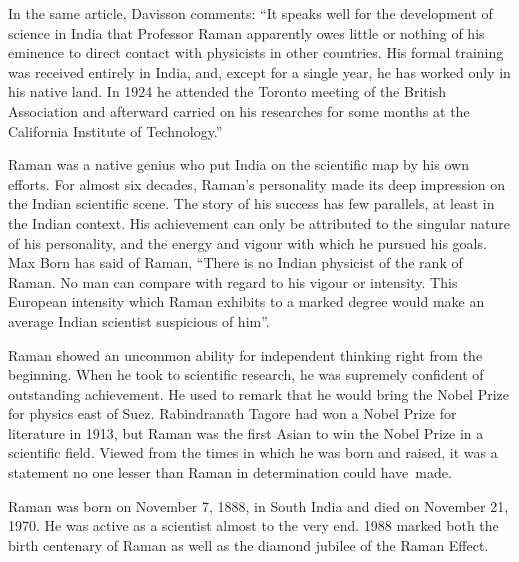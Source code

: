 In the same article, Davisson comments: ``It speaks well for the development of science in India that Professor Raman apparently owes little or nothing of his eminence to direct contact with physicists in other countries. His formal training was received entirely in India, and, except for a single year, he has worked only in his native land. In 1924 he attended the Toronto meeting of the British Association and afterward carried on his researches for some months at the California Institute of Technology.''

Raman was a native genius who put India on the scientific map by his own efforts. For almost six decades, Raman's personality made its deep impression on the Indian scientific scene. The story of his success has few parallels, at least in the Indian context. His achievement can only be attributed to the singular nature of his personality, and the energy and vigour with which he pursued his goals. Max Born has said of Raman, ``There is no Indian physicist of the rank of Raman. No man can compare with regard to his vigour or intensity. This European intensity which Raman exhibits to a marked degree would make an average Indian scientist suspicious of him''.


Raman showed an uncommon ability for independent thinking right from the beginning. When he took to scientific research, he was supremely confident of outstanding achievement. He used to remark that he would bring the Nobel Prize for physics east of Suez. Rabindranath Tagore had won a Nobel Prize for literature in 1913, but Raman was the first Asian to win the Nobel Prize in a scientific field. Viewed from the times in which he was born and raised, it was a statement no one lesser than Raman in determination could have~\hbox{made}.

Raman was born on November 7, 1888, in South India and died on November 21, 1970. He was active as a scientist almost to the very end. 1988 marked both the birth centenary of Raman as well as the diamond jubilee of the Raman Effect.

\medskip
{}
\smallskip



